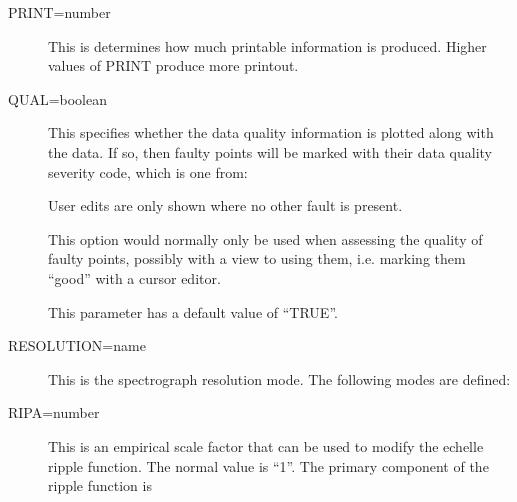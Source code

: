 \begin {description}
\item [PRINT=number]
This is determines how much printable information is produced.
Higher values of PRINT produce more printout.

\item [QUAL=boolean]
This specifies whether the data quality information is plotted
along with the data.
If so, then faulty points will be marked with their data quality
severity code, which is one from:

\begin {quote}
\end {quote}

User edits are only shown where no other fault is present.

This option would normally only be used when assessing the quality
of faulty points, possibly with a view to using them, i.e. marking them
``good'' with a cursor editor.

This parameter has a default value of ``TRUE''.

\item [RESOLUTION=name]
This is the spectrograph resolution mode.
The following modes are defined:

\begin {quote}
\end {quote}

\item [RIPA=number]
This is an empirical scale factor that can be used to modify the
echelle ripple function.
The normal value is ``1''.
The primary component of the ripple function is


\end{description}
